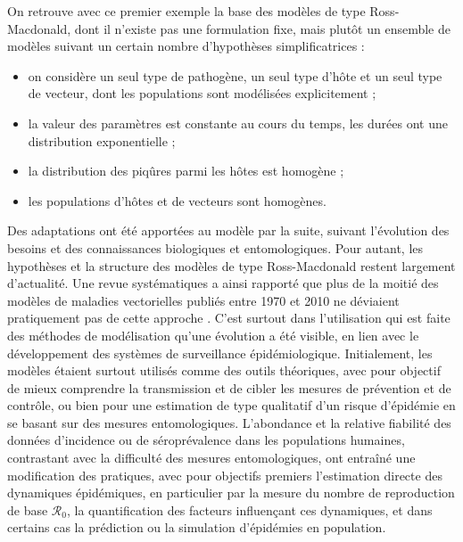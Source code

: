 On retrouve avec ce premier exemple la base des modèles de type Ross-Macdonald, dont il n'existe pas une formulation fixe, mais plutôt un ensemble de modèles suivant un certain nombre d'hypothèses simplificatrices \cite{smith2012ross} : 
\begin{itemize}
\item on considère un seul type de pathogène, un seul type d'hôte et un seul type de vecteur, dont les populations sont modélisées explicitement ;
\item la valeur des paramètres est constante au cours du temps, les durées ont une distribution exponentielle ;
\item la distribution des piqûres parmi les hôtes est homogène ;
\item les populations d'hôtes et de vecteurs sont homogènes.
\end{itemize}
Des adaptations ont été apportées au modèle par la suite, suivant l'évolution des besoins et des connaissances biologiques et entomologiques.
Pour autant, les hypothèses et la structure des modèles de type Ross-Macdonald restent largement d'actualité. 
Une revue systématiques a ainsi rapporté que plus de la moitié des modèles de maladies vectorielles publiés entre 1970 et 2010 ne déviaient pratiquement pas de cette approche \cite{reiner_systematic_2013}.
C'est surtout dans l'utilisation qui est faite des méthodes de modélisation qu'une évolution a été visible, en lien avec le développement des systèmes de surveillance épidémiologique.
Initialement, les modèles étaient surtout utilisés comme des outils théoriques, avec pour objectif de mieux comprendre la transmission et de cibler les mesures de prévention et de contrôle, ou bien pour une estimation de type qualitatif d'un risque d'épidémie en se basant sur des mesures entomologiques.
L'abondance et la relative fiabilité des données d'incidence ou de séroprévalence dans les populations humaines, contrastant avec la difficulté des mesures entomologiques, ont entraîné une modification des pratiques, avec pour objectifs premiers l'estimation directe des dynamiques épidémiques, en particulier par la mesure du nombre de reproduction de base $\mathcal{R}_0$, la quantification des facteurs influençant ces dynamiques, et dans certains cas la prédiction ou la simulation d'épidémies en population.

